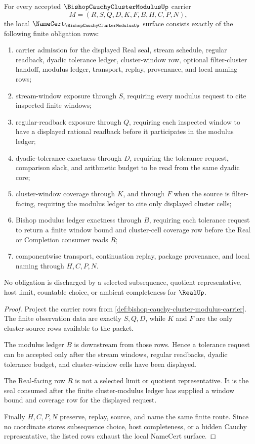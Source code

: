 \begin{theorem}
\label{thm:bishop-cauchy-cluster-modulus-namecert-obligations}
For every accepted $\BishopCauchyClusterModulusUp$ carrier
$$
M=(R,S,Q,D,K,F,B,H,C,P,N),
$$
the local $\NameCert_{\BishopCauchyClusterModulusUp}$ surface consists exactly of the following finite obligation rows:
\begin{enumerate}
\item carrier admission for the displayed Real seal, stream schedule, regular readback, dyadic tolerance ledger, cluster-window row, optional filter-cluster handoff, modulus ledger, transport, replay, provenance, and local naming rows;
\item stream-window exposure through $S$, requiring every modulus request to cite inspected finite windows;
\item regular-readback exposure through $Q$, requiring each inspected window to have a displayed rational readback before it participates in the modulus ledger;
\item dyadic-tolerance exactness through $D$, requiring the tolerance request, comparison slack, and arithmetic budget to be read from the same dyadic core;
\item cluster-window coverage through $K$, and through $F$ when the source is filter-facing, requiring the modulus ledger to cite only displayed cluster cells;
\item Bishop modulus ledger exactness through $B$, requiring each tolerance request to return a finite window bound and cluster-cell coverage row before the Real or Completion consumer reads $R$;
\item componentwise transport, continuation replay, package provenance, and local naming through $H,C,P,N$.
\end{enumerate}
No obligation is discharged by a selected subsequence, quotient representative, host limit, countable choice, or ambient completeness for $\RealUp$.
\end{theorem}
\begin{proof}
Project the carrier rows from \autoref{def:bishop-cauchy-cluster-modulus-carrier}. The finite observation data are exactly $S,Q,D$, while $K$ and $F$ are the only cluster-source rows available to the packet.

The modulus ledger $B$ is downstream from those rows. Hence a tolerance request can be accepted only after the stream windows, regular readbacks, dyadic tolerance budget, and cluster-window cells have been displayed.

The Real-facing row $R$ is not a selected limit or quotient representative. It is the seal consumed after the finite cluster-modulus ledger has supplied a window bound and coverage row for the displayed request.

Finally $H,C,P,N$ preserve, replay, source, and name the same finite route. Since no coordinate stores subsequence choice, host completeness, or a hidden Cauchy representative, the listed rows exhaust the local NameCert surface.
\end{proof}

